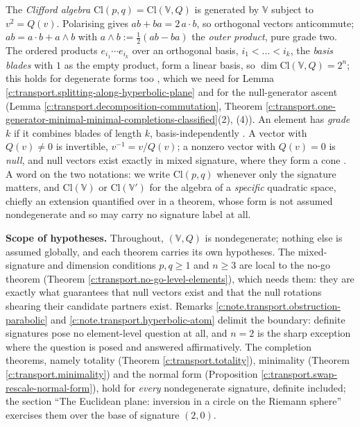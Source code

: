 \documentclass[11pt]{article}
\theoremstyle{definition}
\theoremstyle{plain}
\providecommand{\Cl}{}\renewcommand{\Cl}{\mathrm{Cl}}
\begin{document}
The \emph{Clifford algebra} $\Cl(p,q) = \Cl(\mathbb{V}, Q)$ is generated by $\mathbb{V}$ subject to $v^2 = Q(v)$. Polarising gives $ab + ba = 2\,a \cdot b$, so orthogonal vectors anticommute; $ab = a \cdot b + a \wedge b$ with $a \wedge b \mathrel{:=} \tfrac12(ab-ba)$ the \emph{outer product}, pure grade two. The ordered products $e_{i_1} \cdots e_{i_k}$ over an orthogonal basis, $i_1 < \dots < i_k$, the \emph{basis blades} with $1$ as the empty product, form a linear basis, so $\dim \Cl(\mathbb{V},Q) = 2^n$; this holds for degenerate forms too \cite{Chevalley1997}, which we need for Lemma \ref{c:transport.splitting-along-hyperbolic-plane} and for the null-generator ascent (Lemma \ref{c:transport.decomposition-commutation}, Theorem \ref{c:transport.one-generator-minimal-minimal-completions-classified}(2), (4)). An element has \emph{grade} $k$ if it combines blades of length $k$, basis-independently \cite{Porteous1995}. A vector with $Q(v) \neq 0$ is invertible, $v^{-1} = v/Q(v)$; a nonzero vector with $Q(v) = 0$ is \emph{null}, and null vectors exist exactly in mixed signature, where they form a cone \cite[Sections 2 to 4]{ButlerT0}. A word on the two notations: we write $\Cl(p,q)$ whenever only the signature matters, and $\Cl(\mathbb{V})$ or $\Cl(\mathbb{V}')$ for the algebra of a \emph{specific} quadratic space, chiefly an extension quantified over in a theorem, whose form is not assumed nondegenerate and so may carry no signature label at all.

\label{c:note.transport.setting-quadratic-spaces-clifford-algebras-2}
\textbf{Scope of hypotheses.} Throughout, $(\mathbb{V}, Q)$ is nondegenerate; nothing else is assumed globally, and each theorem carries its own hypotheses. The mixed-signature and dimension conditions $p, q \geq 1$ and $n \geq 3$ are local to the no-go theorem (Theorem \ref{c:transport.no-go-level-elements}), which needs them: they are exactly what guarantees that null vectors exist and that the null rotations shearing their candidate partners exist. Remarks \ref{c:note.transport.obstruction-parabolic} and \ref{c:note.transport.hyperbolic-atom} delimit the boundary: definite signatures pose no element-level question at all, and $n = 2$ is the sharp exception where the question is posed and answered affirmatively. The completion theorems, namely totality (Theorem \ref{c:transport.totality}), minimality (Theorem \ref{c:transport.minimality}) and the normal form (Proposition \ref{c:transport.swap-rescale-normal-form}), hold for \emph{every} nondegenerate signature, definite included; the section ``The Euclidean plane: inversion in a circle on the Riemann sphere'' exercises them over the base of signature $(2,0)$.
\end{document}
